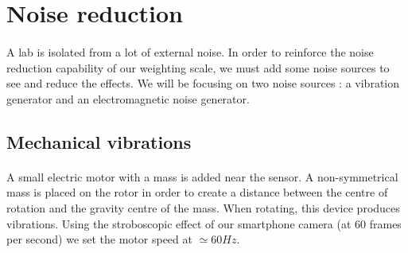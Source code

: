 \documentclass{article}[12pt]
\begin{document}
\section{Noise reduction}
\paragraph{}
A lab is isolated from a lot of external noise. In order to reinforce the noise reduction capability of our weighting scale, we must add some noise sources to see and reduce the effects. We will be focusing on two noise sources : a vibration generator and an electromagnetic noise generator.
\subsection{Mechanical vibrations}
\paragraph{}
A small electric motor with a mass is added near the sensor. A non-symmetrical mass is placed on the rotor in order to create a distance between the centre of rotation and the gravity centre of the mass. When rotating, this device produces vibrations. Using the stroboscopic effect of our smartphone camera (at 60 frames per second) we set the motor speed at $\simeq 60Hz$.
\end{document}
